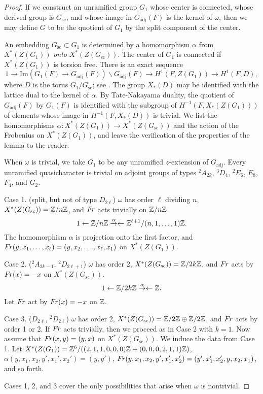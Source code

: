 \documentclass{amsart}
\newcommand\Fr{\text{$F\hskip-.1em r$}}
\newcommand\s{{\text{sc}}}
\newcommand\adj{{\text{adj}}}
\begin{document}
\begin{proof}  If we construct an unramified 
group $G_1$ whose center is connected,
whose derived group is $G_\s$, and whose image in $G_\adj(F)$ is the
kernel of $\omega$, then we may define $G$ to be the quotient of $G_1$
by the split component of the center.  

An embedding $G_{\s}\subset G_1$
is determined by a homomorphism $\alpha$ from
$X^*(Z(G_1))$ {\it onto}  $X^*(Z(G_{\s}))$.  The center of $G_1$ is
connected if $X^*(Z(G_1))$ is torsion free.  
There is an exact sequence
$$1\to \text{Im}(G_1(F)\to G_\adj(F))
	\backslash G_\adj(F) \to H^1(F,Z(G_1))\to H^1(F,D),$$
where $D$ is the torus $G_1/G_\s$; see \cite{Ko3,1.5}.  The
group $X_*(D)$ may be identified with the lattice dual to the
kernel of $\alpha$.  By Tate-Nakayama duality, the quotient of
$G_\adj(F)$ by $G_1(F)$ is identified with the subgroup
of $H^{-1}(F,X_*(Z(G_1)))$ of elements whose image in 
$H^{-1}(F,X_*(D))$ is trivial.
We list the
homomorphisms $\alpha:X^*(Z(G_1))\to X^*(Z(G_{\s}))$ and the action of
the Frobenius on $X^*(Z(G_1))$, and leave the verification of the
properties of the lemma to the reader.

When $\omega$ is trivial, we take $G_1$ to be any unramified $z$-extension
of $G_{\text{adj}}$.  Every unramified quasicharacter is trivial on
adjoint groups of types ${}^2A_{2k}$, ${}^3D_4$, ${}^2E_6$, $E_8$, $F_4$, and
$G_2$. 

\bigskip
{Case 1}. (split, but not of type $D_{2\ell}$)
$\omega$ has order $\ell$ dividing $n$, 
$X^*(Z(G_{\text{sc}})) = {\Bbb Z}/n{\Bbb Z}$,
and $\Fr$ acts trivially on ${\Bbb Z}/n{\Bbb Z}$.
$$1\leftarrow {\Bbb Z}/n{\Bbb Z} \overset\alpha\to\leftarrow
 {\Bbb Z}^{\ell+1}/(n,1,\dots,1){\Bbb Z}.$$
The homomorphism $\alpha$ is projection onto the first factor, and
$\Fr(y,x_1,\dots,x_\ell)
 = (y,x_2,\dots,x_\ell,x_1)$ on $X^*(Z(G_1))$.

\bigskip
{Case 2}. (${}^2A_{2k-1}$,
  ${}^2D_{2\ell+1}$) $\omega$ has order 2, $X^*(Z(G_{\text{sc}})) = {\Bbb Z}/2k{\Bbb Z}
$,
and $\Fr$ acts by $\Fr(x) = -x$ on $X^*(Z(G_{\text{sc}}))$.
$$1\leftarrow {\Bbb Z}/2k{\Bbb Z} \overset\alpha\to\leftarrow {\Bbb Z}.$$
Let $\Fr$ act by
$\Fr(x) = -x$ on ${\Bbb Z}$.

\bigskip
{Case 3}. ($D_{2\ell}$, ${}^2D_{2\ell}$) $\omega$ has order 2,
$X^*(Z(G_{\text{sc}})) = {\Bbb Z}/2{\Bbb Z}\oplus {\Bbb Z}/2{\Bbb Z}$,
and $\Fr$ acts by order 1 or 2.  If $\Fr$ acts trivially, then
we proceed as in Case 2 with $k=1$.  Now assume that
$\Fr(x,y) = (y,x)$ on $X^*(Z(G_{\text{sc}}))$.  
We induce the data from Case 1.  
Let $X^*(Z(G_1)) = {\Bbb Z}^6/((2,1,1,0,0,0){\Bbb Z} +
(0,0,0,2,1,1){\Bbb Z})$, $\alpha(y,x_1,x_2,y',x_1',x_2') = (y,y')$,
$\Fr(y,x_1,x_2,y',x_1',x_2') = (y',x_1',x_2',y,x_2,x_1)$, and so
forth.

Cases 1, 2, and 3 cover the only possibilities that arise when
$\omega$ is nontrivial.
\end{proof}
\end{document}
